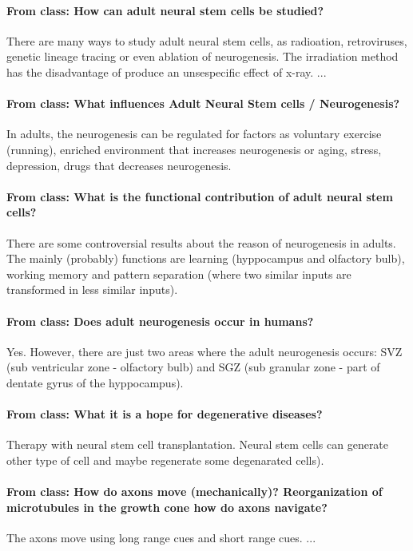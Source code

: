 \documentclass[12pt,article,oneside,a4paper]{memoir}
\begin{document}
\paragraph{From class: How can adult neural stem cells be studied?} There are many ways to study adult neural stem cells, as radioation, retroviruses, genetic lineage tracing or even ablation of neurogenesis. The irradiation method has the disadvantage of produce an unsespecific effect of x-ray. 
...


\paragraph{From class: What influences Adult Neural Stem cells / Neurogenesis?}
In adults, the neurogenesis can be regulated for factors as voluntary exercise (running), enriched environment that increases neurogenesis or aging, stress, depression, drugs that decreases neurogenesis.

\paragraph{From class: What is the functional contribution of adult neural stem cells?}
There are some controversial results about the reason of neurogenesis in adults. The mainly (probably) functions are learning (hyppocampus and olfactory bulb), working memory and pattern separation (where two similar inputs are transformed in less similar inputs).

\paragraph{From class: Does adult neurogenesis occur in humans?}
Yes. However, there are just two areas where the adult neurogenesis occurs: SVZ (sub ventricular zone - olfactory bulb) and SGZ (sub granular zone - part of dentate gyrus of the hyppocampus).

\paragraph{From class: What it is a hope for degenerative diseases?} Therapy with neural stem cell transplantation. Neural stem cells can generate other type of cell and maybe regenerate some degenarated cells).

\paragraph{From class: How do axons move (mechanically)? Reorganization of microtubules in the growth cone how do axons navigate?}
The axons move using long range cues and short range cues. ...
\end{document}
